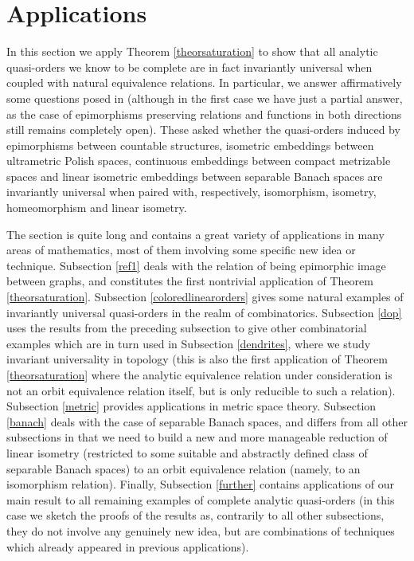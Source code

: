 \documentclass{amsart}
\theoremstyle{definition}
\theoremstyle{remark}
\begin{document}
\section{Applications}\label{sectionapplications}

In this section we apply Theorem \ref{theorsaturation} to show that
all analytic quasi-orders we know to be complete are in fact invariantly universal when coupled with
natural equivalence relations. In
particular, we
answer affirmatively some questions
posed in \cite[Questions 6
and 8]{FriMot} (although in the first case we have just a partial
answer, as the case of epimorphisms preserving relations and functions
in both directions still remains completely open).
These asked whether the quasi-orders induced by epimorphisms between countable structures, isometric embeddings between ultrametric Polish spaces, continuous embeddings between compact metrizable spaces and linear isometric embeddings between separable Banach spaces are invariantly universal when paired with, respectively, isomorphism, isometry, homeomorphism and linear isometry.

The section is quite long and contains a great variety of applications
in many areas of mathematics, most of them involving some specific new
idea or technique. Subsection \ref{ref1} deals with the relation of
being epimorphic image between graphs, and constitutes the first
nontrivial application of Theorem \ref{theorsaturation}. Subsection
\ref{coloredlinearorders} gives some natural  examples of invariantly
universal quasi-orders in the realm of combinatorics. Subsection
\ref{dop} uses the results from the preceding subsection to give other
combinatorial examples which are in turn used in Subsection
\ref{dendrites}, where we study invariant universality in topology
(this is also the first application of Theorem \ref{theorsaturation}
where the analytic equivalence relation under consideration is not an
orbit equivalence relation itself, but is only reducible to such a
relation). Subsection \ref{metric} provides applications in metric
space theory. Subsection \ref{banach} deals with the case of separable
Banach spaces, and differs from all other subsections in that we need
to build a new and more manageable reduction of linear isometry
(restricted to some suitable and abstractly defined class of separable
Banach spaces) to an orbit equivalence relation (namely, to an
isomorphism relation). Finally, Subsection \ref{further} contains
applications of our main result to all remaining examples of complete
analytic quasi-orders (in this case we sketch the proofs of the results
as, contrarily to all other subsections, they do not involve any
genuinely new idea, but are combinations of techniques which already
appeared in previous applications).
\end{document}
